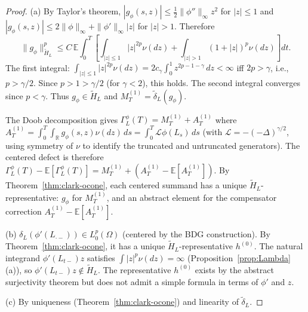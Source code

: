 \documentclass[11pt,a4paper]{article}
\theoremstyle{plain}
\theoremstyle{definition}
\theoremstyle{remark}
\newcommand{\E}{\mathbb{E}}
\newcommand{\R}{\mathbb{R}}
\begin{document}
\begin{proof}
(a) By Taylor's theorem, $|g_\phi(s,z)| \leq
\tfrac{1}{2}\|\phi''\|_\infty z^2$ for $|z| \leq 1$
and $|g_\phi(s,z)| \leq 2\|\phi\|_\infty +
\|\phi'\|_\infty|z|$ for $|z| > 1$.  Therefore
\[
  \|g_\phi\|_{\widetilde{H}_L}^p
  \leq C\,\E\!\int_0^T\!\left[
  \int_{|z|\leq 1}|z|^{2p}\nu(dz)
  + \int_{|z|>1}(1+|z|)^p\nu(dz)\right]dt.
\]
The first integral:
$\int_{|z|\leq 1}|z|^{2p}\nu(dz)
= 2c_\gamma\int_0^1 z^{2p-1-\gamma}\,dz < \infty$
iff $2p > \gamma$, i.e., $p > \gamma/2$.
Since $p > 1 > \gamma/2$ (for $\gamma < 2$), this holds.
The second integral converges since $p < \gamma$.
Thus $g_\phi \in \widetilde{H}_L$ and
$M_T^{(1)} = \widetilde{\delta}_L(g_\phi)$.

The Doob decomposition gives
$\Gamma_L^\phi(T) = M_T^{(1)} + A_T^{(1)}$ where
$A_T^{(1)} = \int_0^T\!\int_\R g_\phi(s,z)\nu(dz)\,ds
= \int_0^T\mathcal{L}\phi(L_s)\,ds$
(with $\mathcal{L} = -(-\Delta)^{\gamma/2}$, using
symmetry of $\nu$ to identify the truncated and
untruncated generators).
The centered defect is therefore
$\Gamma_L^\phi(T) - \E[\Gamma_L^\phi(T)]
= M_T^{(1)} + (A_T^{(1)} - \E[A_T^{(1)}])$.
By Theorem~\ref{thm:clark-ocone}, each centered summand
has a unique $\widetilde{H}_L$-representative:
$g_\phi$ for $M_T^{(1)}$, and an abstract element
for the compensator correction $A_T^{(1)} - \E[A_T^{(1)}]$.

(b) $\delta_L(\phi'(L_{\cdot-})) \in L^p_0(\Omega)$
(centered by the BDG construction).  By
Theorem~\ref{thm:clark-ocone}, it has a unique
$\widetilde{H}_L$-representative $h^{(0)}$.
The natural integrand $\phi'(L_{t-})z$ satisfies
$\int|z|^p\nu(dz) = \infty$ (Proposition~\ref{prop:Lambda}(a)),
so $\phi'(L_{t-})z \notin \widetilde{H}_L$.
The representative $h^{(0)}$ exists by the abstract
surjectivity theorem but does not admit a simple formula
in terms of $\phi'$ and $z$.

(c) By uniqueness (Theorem~\ref{thm:clark-ocone})
and linearity of $\widetilde{\delta}_L$.
\end{proof}
\end{document}
